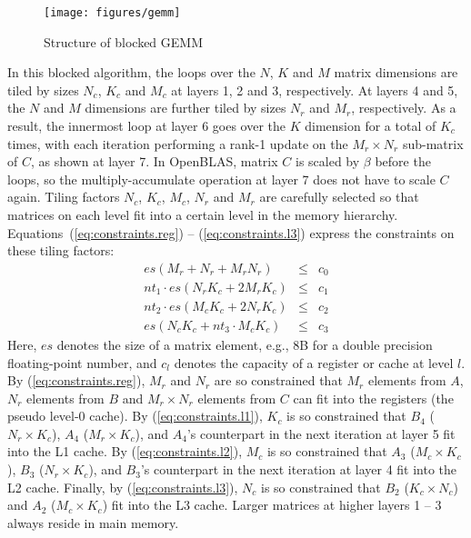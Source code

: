 \begin{figure}[t]
  \centering
  \texttt{[image: figures/gemm]}
  \caption{Structure of blocked GEMM}
  \label{fig:gemm}
\end{figure}

In this blocked algorithm, the loops over the $N$, $K$ and $M$
matrix dimensions are tiled by sizes $N_c$, $K_c$ and $M_c$ at 
layers 1, 2 and 3, respectively.
At layers 4 and 5, the $N$ and $M$ dimensions are further tiled by sizes
$N_r$ and $M_r$, respectively.
As a result, the innermost loop at layer 6 goes over the $K$
dimension for a total of $K_c$ times,
with each iteration performing a rank-1 update on
the $M_r \times N_r$ sub-matrix of $C$, as shown at layer 7.
In OpenBLAS, matrix $C$ is scaled by $\beta$ before the loops,
so the multiply-accumulate operation at layer 7 does not have to scale $C$ again.
Tiling factors $N_c$, $K_c$, $M_c$, $N_r$ and $M_r$ are carefully selected so that
matrices on each level fit into a certain level in the memory hierarchy.
Equations~(\ref{eq:constraints.reg}) -- (\ref{eq:constraints.l3}) express
the constraints on these tiling factors:
\begin{eqnarray}
  es (M_r + N_r + M_r N_r) & \le & c_{0} \label{eq:constraints.reg}\\
  nt_{1} \cdot es (N_r K_c + 2 M_r K_c) & \le & c_{1} \label{eq:constraints.l1}\\
  nt_{2} \cdot es (M_c K_c + 2 N_r K_c) & \le & c_{2} \label{eq:constraints.l2}\\
  es (N_c K_c + nt_{3} \cdot M_c K_c)   & \le & c_{3} \label{eq:constraints.l3}
\end{eqnarray}
Here, $es$ denotes the size of a matrix element,
e.g., 8B for a double precision floating-point number,
and $c_l$ denotes the capacity of a register or cache at level $l$.
By (\ref{eq:constraints.reg}), $M_r$ and $N_r$ are so
constrained that $M_r$ elements from $A$,
$N_r$ elements from $B$ and $M_r \times N_r$ elements from $C$ can
fit into the registers (the pseudo level-0 cache).
By (\ref{eq:constraints.l1}), $K_c$ is so constrained that $B_4$ ($N_r \times K_c$),
$A_4$ ($M_r \times K_c$), and $A_4$'s counterpart in the next iteration
at layer 5 fit into the L1 cache.
By (\ref{eq:constraints.l2}), $M_c$ is so constrained that $A_3$ ($M_c \times K_c$),
$B_3$ ($N_r \times K_c$), and $B_3$'s counterpart in the next iteration
at layer 4 fit into the L2 cache.
Finally, by (\ref{eq:constraints.l3}), $N_c$ is so constrained that 
$B_2$ ($K_c \times N_c$) and $A_2$ ($M_c \times K_c$) fit into the L3 cache.
Larger matrices at higher layers 1 -- 3 always reside in main memory.

